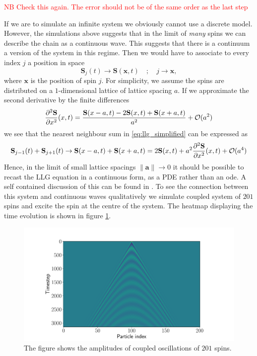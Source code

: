 \begin{remark}

\textcolor{red}{NB Check this again. The error should not be of the same order as the last step}

If we are to simulate an infinite system we obviously cannot use a discrete model. However, the simulations above suggests that in the limit of \textit{many} spins we can describe the chain as a continuous wave. This suggests that there is a continuum a version of the system in this regime. Then we would have to associate to every index $j$ a position in space 
$$
	\mathbf{S}_j(t) \to \mathbf{S}(\mathbf{x},t) \quad ; \quad j \to \mathbf{x},
$$
where $\mathbf{x}$ is the position of spin $j$. For simplicity, we assume the spins are distributed on a $1$-dimensional lattice of lattice spacing $a$. 
If we approximate the second derivative by the finite differences 
$$
	  \frac{\partial^2 \mathbf{S}}{\partial x^2}(x,t) = \frac{\mathbf{S}(x - a,t) - 2 \mathbf{S}(x,t) + \mathbf{S}(x + a,t) }{ a^2} + \mathcal{O}(a^2)
$$
we see that the nearest neighbour sum in \eqref{eq:llg_simplified} can be expressed as
$$
	\mathbf{S}_{j-1}(t) + \mathbf{S}_{j+1}(t) \to \mathbf{S}(x-a,t) + \mathbf{S}(x+a,t) = 2 \mathbf{S}(x,t) + a^2 \frac{\partial^2 \mathbf{S}}{\partial x^2} (x,t) + \mathcal{O}(a^4)
$$
Hence, in the limit of small lattice spacings $\|\mathbf{a}\| \to 0$ it should be possible to recast the LLG equation in a continuous form, as a PDE rather than an ode. A self contained discussion of this can be found in \cite{Lakshmanan2011}. To see the connection between this system and continuous waves qualitatively we simulate coupled system of $201$ spins and excite the spin at the centre of the system. The heatmap displaying the time evolution is shown in figure \ref{fig:200_heat}.

\begin{figure}[htb]
	\centering
	\includegraphics[width=\columnwidth]{../fig/wave_200.pdf}
	\caption{The figure shows the amplitudes of coupled oscillations of $201$ spins.}
	\label{fig:200_heat}
\end{figure}

\end{remark}

